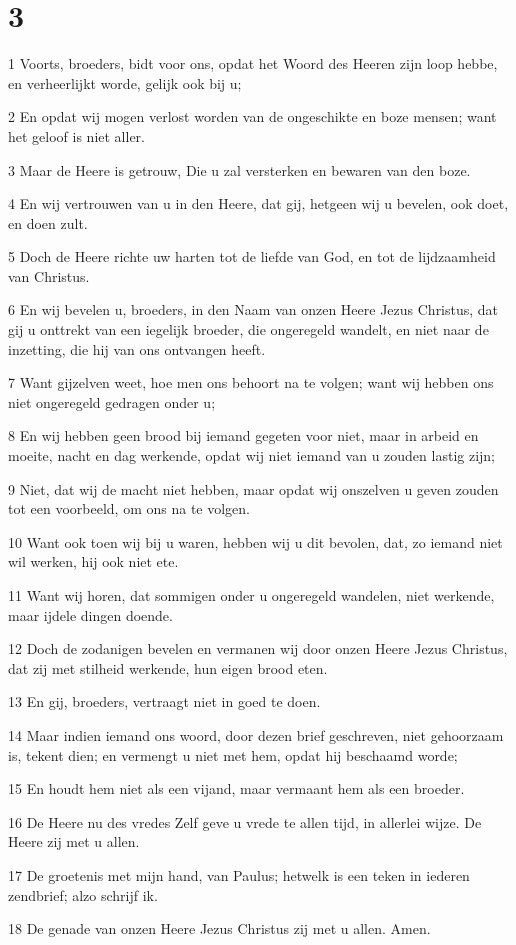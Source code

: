 \chapter{3}

\par 1 Voorts, broeders, bidt voor ons, opdat het Woord des Heeren zijn loop hebbe, en verheerlijkt worde, gelijk ook bij u;
\par 2 En opdat wij mogen verlost worden van de ongeschikte en boze mensen; want het geloof is niet aller.
\par 3 Maar de Heere is getrouw, Die u zal versterken en bewaren van den boze.
\par 4 En wij vertrouwen van u in den Heere, dat gij, hetgeen wij u bevelen, ook doet, en doen zult.
\par 5 Doch de Heere richte uw harten tot de liefde van God, en tot de lijdzaamheid van Christus.
\par 6 En wij bevelen u, broeders, in den Naam van onzen Heere Jezus Christus, dat gij u onttrekt van een iegelijk broeder, die ongeregeld wandelt, en niet naar de inzetting, die hij van ons ontvangen heeft.
\par 7 Want gijzelven weet, hoe men ons behoort na te volgen; want wij hebben ons niet ongeregeld gedragen onder u;
\par 8 En wij hebben geen brood bij iemand gegeten voor niet, maar in arbeid en moeite, nacht en dag werkende, opdat wij niet iemand van u zouden lastig zijn;
\par 9 Niet, dat wij de macht niet hebben, maar opdat wij onszelven u geven zouden tot een voorbeeld, om ons na te volgen.
\par 10 Want ook toen wij bij u waren, hebben wij u dit bevolen, dat, zo iemand niet wil werken, hij ook niet ete.
\par 11 Want wij horen, dat sommigen onder u ongeregeld wandelen, niet werkende, maar ijdele dingen doende.
\par 12 Doch de zodanigen bevelen en vermanen wij door onzen Heere Jezus Christus, dat zij met stilheid werkende, hun eigen brood eten.
\par 13 En gij, broeders, vertraagt niet in goed te doen.
\par 14 Maar indien iemand ons woord, door dezen brief geschreven, niet gehoorzaam is, tekent dien; en vermengt u niet met hem, opdat hij beschaamd worde;
\par 15 En houdt hem niet als een vijand, maar vermaant hem als een broeder.
\par 16 De Heere nu des vredes Zelf geve u vrede te allen tijd, in allerlei wijze. De Heere zij met u allen.
\par 17 De groetenis met mijn hand, van Paulus; hetwelk is een teken in iederen zendbrief; alzo schrijf ik.
\par 18 De genade van onzen Heere Jezus Christus zij met u allen. Amen.



